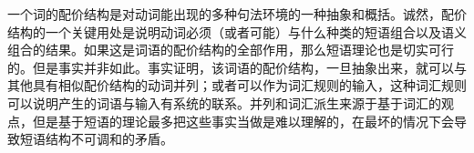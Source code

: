     一个词的配价结构是对动词能出现的多种句法环境的一种抽象和概括。诚然，配价结构的一个关键用处是说明动词必须（或者可能）与什么种类的短语组合以及语义组合的结果。如果这是词语的配价结构的全部作用，那么短语理论也是切实可行的。但是事实并非如此。事实证明，该词语的配价结构，一旦抽象出来，就可以与其他具有相似配价结构的动词并列；或者可以作为词汇规则的输入，这种词汇规则可以说明产生的词语与输入有系统的联系。并列和词汇派生来源于基于词汇的观点，但是基于短语的理论最多把这些事实当做是难以理解的，在最坏的情况下会导致短语结构不可调和的矛盾。

%
%
%


